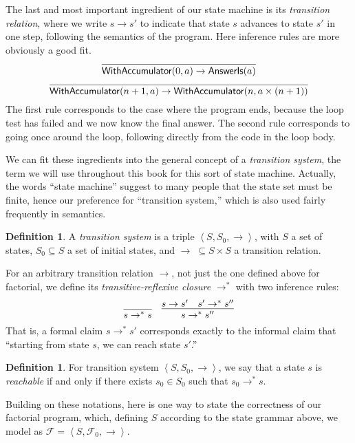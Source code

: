 \documentclass{amsbook}
\theoremstyle{definition}
\newtheorem{definition}[theorem]{Definition}
\theoremstyle{remark}
\numberwithin{section}{chapter}
\numberwithin{equation}{chapter}
\begin{document}
The last and most important ingredient of our state machine is its \emph{transition relation}, where we write $s \to s'$ to indicate that state $s$ advances to state $s'$ in one step, following the semantics of the program.
Here inference rules are more obviously a good fit.
$$\infer{\mathsf{WithAccumulator}(0, a) \to \mathsf{AnswerIs}(a)}{}$$
$$\infer{\mathsf{WithAccumulator}(n+1, a) \to \mathsf{WithAccumulator}(n, a \times (n+1))}{}$$
The first rule corresponds to the case where the program ends, because the loop test has failed and we now know the final answer.
The second rule corresponds to going once around the loop, following directly from the code in the loop body.

We can fit these ingredients into the general concept of a \emph{transition system}, the term we will use throughout this book for this sort of state machine.
Actually, the words ``state machine'' suggest to many people that the state set must be finite, hence our preference for ``transition system,'' which is also used fairly frequently in semantics.

\newcommand{\angled}[1]{{\left \langle #1 \right \rangle}}

\begin{definition}
  A \emph{transition system} is a triple $\angled{S, S_0, \to}$, with $S$ a set of states, $S_0 \subseteq S$ a set of initial states, and $\to \; \subseteq S \times S$ a transition relation.
\end{definition}

For an arbitrary transition relation $\to$, not just the one defined above for factorial, we define its \emph{transitive-reflexive closure} $\to^*$ with two inference rules:
$$\infer{s \to^* s}{}
\quad \infer{s \to^* s''}{
  s \to s'
  & s' \to^* s''
}$$
That is, a formal claim $s \to^* s'$ corresponds exactly to the informal claim that ``starting from state $s$, we can reach state $s'$.''

\begin{definition}
  For transition system $\angled{S, S_0, \to}$, we say that a state $s$ is \emph{reachable} if and only if there exists $s_0 \in S_0$ such that $s_0 \to^* s$.
\end{definition}

Building on these notations, here is one way to state the correctness of our factorial program, which, defining $S$ according to the state grammar above, we model as $\mathcal F = \angled{S, \mathcal F_0, \to}$.
\end{document}
